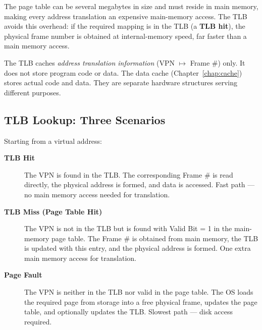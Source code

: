 \documentclass[11pt, a4paper, notitlepage]{report}
\theoremstyle{definition}
\theoremstyle{remark}
\theoremstyle{definition}
\begin{document}
The page table can be several megabytes in size and must reside in main memory, making every address translation an expensive main-memory access. The TLB avoids this overhead: if the required mapping is in the TLB (a \textbf{TLB hit}), the physical frame number is obtained at internal-memory speed, far faster than a main memory access.

\begin{warning}[title={Warning: TLB $\ne$ Data Cache}]
  The TLB caches \emph{address translation information} (VPN $\mapsto$ Frame \#) only. It does not store program code or data. The data cache (Chapter~\ref{chap:cache}) stores actual code and data. They are separate hardware structures serving different purposes.
\end{warning}

\subsection{TLB Lookup: Three Scenarios}
\label{sec:tlb-scenarios}

Starting from a virtual address:

\begin{description}
  \item[\textbf{TLB Hit}] The VPN is found in the TLB. The corresponding Frame \# is read directly, the physical address is formed, and data is accessed. Fast path — no main memory access needed for translation.
  \item[\textbf{TLB Miss (Page Table Hit)}] The VPN is not in the TLB but is found with Valid Bit = 1 in the main-memory page table. The Frame \# is obtained from main memory, the TLB is updated with this entry, and the physical address is formed. One extra main memory access for translation.
  \item[\textbf{Page Fault}] The VPN is neither in the TLB nor valid in the page table. The OS loads the required page from storage into a free physical frame, updates the page table, and optionally updates the TLB. Slowest path — disk access required.
\end{description}
\end{document}
